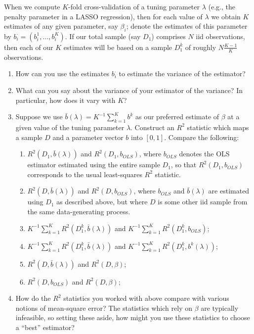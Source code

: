 \documentclass[12pt]{amsart}
\begin{document}
When we compute \(K\)-fold cross-validation of a tuning parameter \(\lambda\)
(e.g., the penalty parameter in a LASSO regression), then for each value of
\(\lambda\) we obtain \(K\) estimates of any given parameter, say
\(\beta_i\); denote the estimates of this parameter by
\(b_{i}^\cdot=(b_{i}^1,\dots,b_{i}^K)\).  If our total sample (say
\(D_1\)) comprises
\(N\) iid observations, then each of our \(K\) estimates will be based
on a sample \(D_1^k\) of roughly \(N\frac{K-1}{K}\) observations.
\begin{enumerate}
\item How can you use the estimates \(b_{i}^\cdot\) to estimate the
variance of the estimator?
\item What can you say about the variance of your estimator of the
variance?  In particular, how does it vary with \(K\)?
\item Suppose we use \(\bar{b}(\lambda)=K^{-1}\sum_{k=1}^K b^{k}\) as our
preferred estimate of \(\beta\) at a given value of the tuning
parameter \(\lambda\).  Construct an \(R^2\) statistic which maps a
sample \(D\) and a parameter vector \(b\) into \([0,1]\).  Compare the
following:

\begin{enumerate}
\item \(R^2(D_1,\bar{b}(\lambda))\) and \(R^2(D_1,b_{OLS})\), where
\(b_{OLS}\) denotes the OLS estimator estimated using the entire
sample \(D_1\), so that \(R^2(D_1,b_{OLS})\) corresponds to the
usual least-squares \(R^2\) statistic.

\item \(R^2(D,\bar{b}(\lambda))\) and \(R^2(D,b_{OLS})\), where
\(b_{OLS}\) and \(\bar{b}(\lambda)\) are estimated using \(D_1\) as
described above, but where \(D\) is some other iid sample from
the same data-generating process.

\item \(K^{-1}\sum_{k=1}^K R^2(D_1^k,\bar{b}(\lambda))\) and
\(K^{-1}\sum_{k=1}^K R^2(D_1^k,b_{OLS})\);

\item \(K^{-1}\sum_{k=1}^K R^2(D_1^k,\bar{b}(\lambda))\) and
\(K^{-1}\sum_{k=1}^K R^2(D_1^k,b^{k}(\lambda))\);

\item \(R^2(D,\bar{b}(\lambda))\) and \(R^2(D,\beta)\);

\item \(R^2(D,b_{OLS})\) and \(R^2(D,\beta)\);
\end{enumerate}

\item How do the \(R^2\) statistics you worked with above compare with
various notions of mean-square error?  The statistics which rely
on \(\beta\) are typically infeasible, so setting these aside, how
might you use these statistics to choose a ``best'' estimator?
\end{enumerate}
\end{document}
